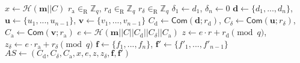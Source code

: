 \begin{algorithm}[ht]
    \DontPrintSemicolon
    \caption{$\mathsf{ProveASKC}(\psi; r; \boldsymbol{m}; C)$}
    
    $x \gets \mathcal{H}(\boldsymbol{m} || C)$ \;
    $r_\mathrm{a} \in_\mathrm{R} \mathbb{Z}_q$, $r_\mathrm{d} \in_\mathrm{R} \mathbb{Z}_q$ $r_\delta \in_\mathrm{R} \mathbb{Z}_q$ \;
    $\delta_1 \gets d_1$, $\delta_n \gets 0$ \;
    $\boldsymbol{d} \gets \{d_1, ..., d_n\}$, $\boldsymbol{u} \gets \{u_1, ..., u_{n-1}\}$, $\boldsymbol{v} \gets \{v_1, ..., v_{n-1}\}$ \;
    $C_\mathrm{d} \gets \mathsf{Com} (\boldsymbol{d}; r_\mathrm{d})$, $C_\delta \gets \mathsf{Com} (\boldsymbol{u}; r_\delta)$, $C_\mathrm{a} \gets \mathsf{Com} (\boldsymbol{v}; r_\mathrm{a})$ \;
    $e \gets \mathcal{H}(\boldsymbol{m} || C || C_\mathrm{d} || C_\delta || C_\mathrm{a})$ \;
    $z \gets e \cdot r + r_\mathrm{d} \pmod q$, $z_\delta \gets e \cdot r_\mathrm{a} + r_\delta \pmod q$ \;
    $\boldsymbol{f} \gets \{f_1, ..., f_n\}$, $\boldsymbol{f'} \gets \{f'_1, ..., f'_{n-1}\}$ \;
    $AS \gets (C_\mathrm{d}, C_\delta, C_\mathrm{a}, x, e, z, z_\delta, \boldsymbol{f}, \boldsymbol{f'})$ \;
    
     
    
    \label{alg: prove askc}
\end{algorithm}

